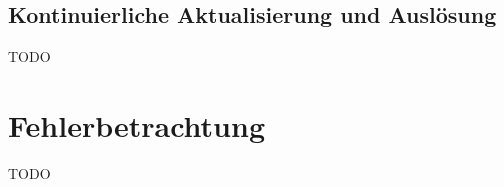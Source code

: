 
\subsection{Kontinuierliche Aktualisierung und Auslösung}\label{design_aktualisierung}
TODO


\section{Fehlerbetrachtung}
TODO